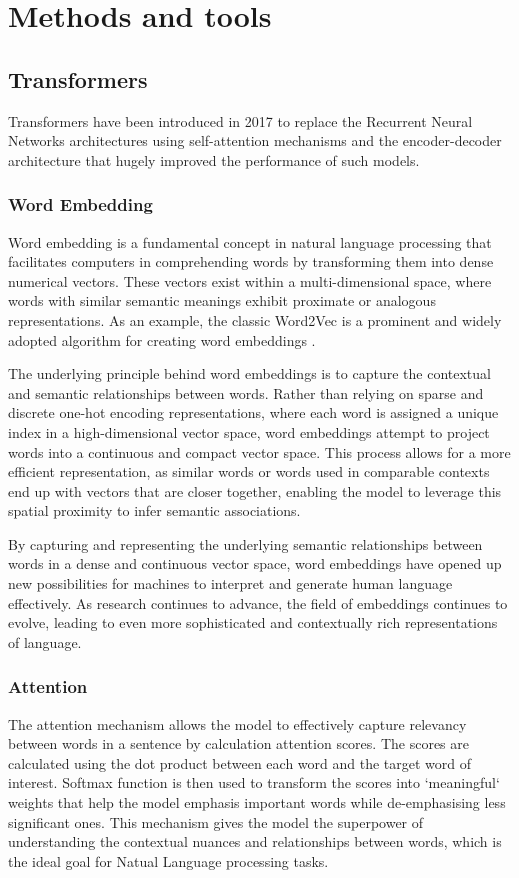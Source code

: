 \documentclass[a4paper,12pt,twoside]{report}
\begin{document}
\chapter{Methods and tools}
\thispagestyle{empty}
\section{Transformers}
Transformers \cite{NIPS2017_3f5ee243} have been introduced in 2017 to replace the Recurrent Neural Networks architectures using self-attention mechanisms and the encoder-decoder architecture that hugely improved the performance of such models.

\subsection{Word Embedding}
Word embedding is a fundamental concept in natural language processing that facilitates computers in comprehending words by transforming them into dense numerical vectors. These vectors exist within a multi-dimensional space, where words with similar semantic meanings exhibit proximate or analogous representations. As an example, the classic Word2Vec is a prominent and widely adopted algorithm for creating word embeddings \cite{mikolov2013efficient}.

The underlying principle behind word embeddings is to capture the contextual and semantic relationships between words. Rather than relying on sparse and discrete one-hot encoding representations, where each word is assigned a unique index in a high-dimensional vector space, word embeddings attempt to project words into a continuous and compact vector space. This process allows for a more efficient representation, as similar words or words used in comparable contexts end up with vectors that are closer together, enabling the model to leverage this spatial proximity to infer semantic associations.

 By capturing and representing the underlying semantic relationships between words in a dense and continuous vector space, word embeddings have opened up new possibilities for machines to interpret and generate human language effectively. As research continues to advance, the field of embeddings continues to evolve, leading to even more sophisticated and contextually rich representations of language.

\subsection{Attention}
The attention mechanism allows the model to effectively capture relevancy between words in a sentence by calculation attention scores. The scores are calculated using the dot product between each word and the target word of interest. Softmax function is then used to transform the scores into `meaningful` weights that help the model emphasis important words while de-emphasising less significant ones. This mechanism gives the model the superpower of understanding the contextual nuances and relationships between words, which is the ideal goal for Natual Language processing tasks.
\end{document}
